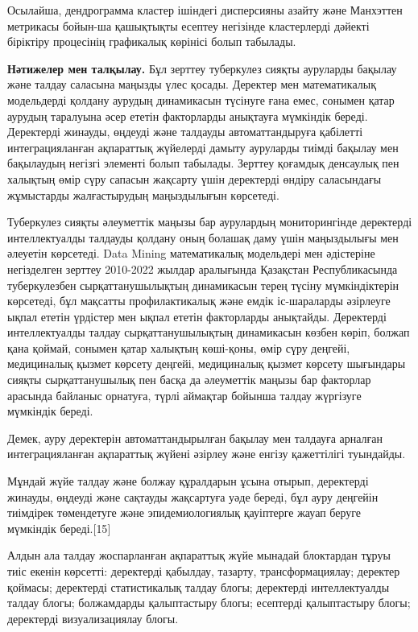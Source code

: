 Осылайша, дендрограмма кластер ішіндегі дисперсияны азайту және
Манхэттен метрикасы бойын-ша қашықтықты есептеу негізінде кластерлерді
дәйекті біріктіру процесінің графикалық көрінісі болып табылады.
\begin{multicols}{2}

{\bfseries Нәтижелер мен талқылау.} Бұл зерттеу туберкулез сияқты ауруларды
бақылау және талдау саласына маңызды үлес қосады. Деректер мен
математикалық модельдерді қолдану аурудың динамикасын түсінуге ғана
емес, сонымен қатар аурудың таралуына әсер ететін факторларды анықтауға
мүмкіндік береді. Деректерді жинауды, өңдеуді және талдауды
автоматтандыруға қабілетті интеграцияланған ақпараттық жүйелерді дамыту
ауруларды тиімді бақылау мен бақылаудың негізгі элементі болып табылады.
Зерттеу қоғамдық денсаулық пен халықтың өмір сүру сапасын жақсарту үшін
деректерді өндіру саласындағы жұмыстарды жалғастырудың маңыздылығын
көрсетеді.

Туберкулез сияқты әлеуметтік маңызы бар аурулардың мониторингінде
деректерді интеллектуалды талдауды қолдану оның болашақ даму үшін
маңыздылығы мен әлеуетін көрсетеді. Data Mining математикалық модельдері
мен әдістеріне негізделген зерттеу 2010-2022 жылдар аралығында Қазақстан
Республикасында туберкулезбен сырқаттанушылықтың динамикасын терең
түсіну мүмкіндіктерін көрсетеді, бұл мақсатты профилактикалық және емдік
іс-шараларды әзірлеуге ықпал ететін үрдістер мен ықпал ететін
факторларды анықтайды. Деректерді интеллектуалды талдау
сырқаттанушылықтың динамикасын көзбен көріп, болжап қана қоймай, сонымен
қатар халықтың көші-қоны, өмір сүру деңгейі, медициналық қызмет көрсету
деңгейі, медициналық қызмет көрсету шығындары сияқты сырқаттанушылық пен
басқа да әлеуметтік маңызы бар факторлар арасында байланыс орнатуға,
түрлі аймақтар бойынша талдау жүргізуге мүмкіндік береді.

Демек, ауру деректерін автоматтандырылған бақылау мен талдауға арналған
интеграцияланған ақпараттық жүйені әзірлеу және енгізу қажеттілігі
туындайды.

Мұндай жүйе талдау және болжау құралдарын ұсына отырып, деректерді
жинауды, өңдеуді және сақтауды жақсартуға уәде береді, бұл ауру деңгейін
тиімдірек төмендетуге және эпидемиологиялық қауіптерге жауап беруге
мүмкіндік береді.{[}15{]}

Алдын ала талдау жоспарланған ақпараттық жүйе мынадай блоктардан тұруы
тиіс екенін көрсетті: деректерді қабылдау, тазарту, трансформациялау;
деректер қоймасы; деректерді статистикалық талдау блогы; деректерді
интеллектуалды талдау блогы; болжамдарды қалыптастыру блогы; есептерді
қалыптастыру блогы; деректерді визуализациялау блогы.


\end{multicols}
